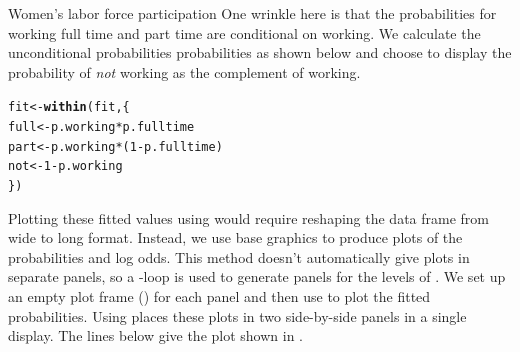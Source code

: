 \documentclass[11pt]{book}\usepackage[]{graphicx}\usepackage[]{color}
\makeatletter
\newcommand{\hlnum}[1]{\textcolor[rgb]{0.686,0.059,0.569}{#1}}%
\newcommand{\hlopt}[1]{\textcolor[rgb]{0,0,0}{#1}}%
\newcommand{\hlstd}[1]{\textcolor[rgb]{0.345,0.345,0.345}{#1}}%
\newcommand{\hlkwb}[1]{\textcolor[rgb]{0.69,0.353,0.396}{#1}}%
\newcommand{\hlkwd}[1]{\textcolor[rgb]{0.737,0.353,0.396}{\textbf{#1}}}%
\newenvironment{kframe}{%
 \def\at@end@of@kframe{}%
 \ifinner\ifhmode%
  \def\at@end@of@kframe{\end{minipage}}%
  \begin{minipage}{\columnwidth}%
 \fi\fi%
 \def\FrameCommand##1{\hskip\@totalleftmargin \hskip-\fboxsep
 \colorbox{shadecolor}{##1}\hskip-\fboxsep
     \hskip-\linewidth \hskip-\@totalleftmargin \hskip\columnwidth}%
 \MakeFramed {\advance\hsize-\width
   \@totalleftmargin\z@ \linewidth\hsize
   \@setminipage}}%
 {\par\unskip\endMakeFramed%
 \at@end@of@kframe}
\newenvironment{knitrout}{}{} %
\renewenvironment{knitrout}{\small\renewcommand{\baselinestretch}{.85}}{} %
\makeatother
\begin{document}
\begin{Example}[wlfpart1]{Women's labor force participation}
\begin{knitrout}
\end{knitrout}
One wrinkle here is that the probabilities for working full time
and part time are conditional on working. We calculate the
unconditional probabilities probabilities as shown below
and choose to display the probability of
\emph{not} working as the complement of working.
\begin{knitrout}
\color{fgcolor}\begin{kframe}
\begin{alltt}
\hlstd{fit} \hlkwb{<-} \hlkwd{within}\hlstd{(fit, \{}
  \hlstd{full} \hlkwb{<-} \hlstd{p.working} \hlopt{*} \hlstd{p.fulltime}
  \hlstd{part} \hlkwb{<-} \hlstd{p.working} \hlopt{*} \hlstd{(}\hlnum{1} \hlopt{-} \hlstd{p.fulltime)}
  \hlstd{not}  \hlkwb{<-} \hlnum{1} \hlopt{-} \hlstd{p.working}
  \hlstd{\})}
\end{alltt}
\end{kframe}
\end{knitrout}

Plotting these fitted values using  would require
reshaping the  data frame from wide to long format.
Instead, we use \R base graphics to produce plots of the
probabilities and log odds.  This method doesn't automatically
give plots in separate panels, so a -loop is used
to generate panels for the levels of .
We set up an empty plot frame () for each panel
and then use  to plot the fitted probabilities.
Using  places these plots in two
side-by-side panels in a single display.
The lines below give the plot shown in .


\end{Example}
\end{document}
